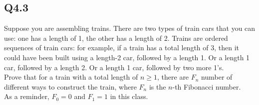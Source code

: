 \documentclass{article}
\begin{document}
\subsection*{Q4.3}
Suppose you are assembling trains. There are two types of train cars that you can use: one has a length of 1, the other has a length of 2. Trains are ordered sequences of train cars: for example, if a train has a total length of 3, then it could have been built using a length-2 car, followed by a length 1. Or a length 1 car, followed by a length 2. Or a length 1 car, followed by two more 1's.
\\ Prove that for a train with a total length of $n\geq1$, there are $F_n$ number of different ways to construct the train, where $F_n$ is the $n$-th Fibonacci number.
\\ As a reminder, $F_0=0$ and $F_1=1$ in this class.
\newpage
\end{document}
